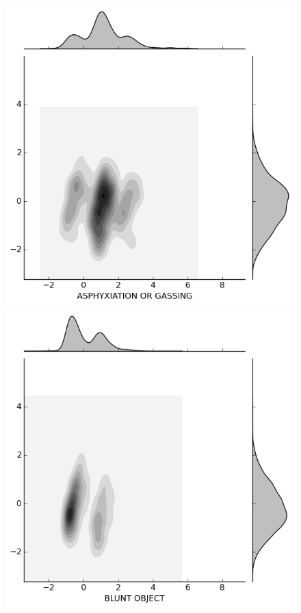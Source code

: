 \begin{figure}[H]
 
  \centering
  
  \begin{minipage}[b]{0.20\linewidth}
    \includegraphics[width=\linewidth]{images/weapon/ASPHYXIATION.png}
  \end{minipage}
  \quad
  \begin{minipage}[b]{0.20\linewidth}
    \includegraphics[width=\linewidth]{images/weapon/BLUNT_OBJECT.png}

\end{minipage}
\end{figure}
